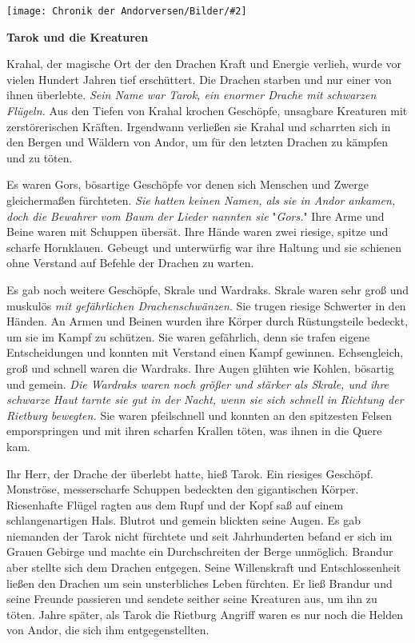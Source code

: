 \documentclass[10pt, a4paper, oneside]{book}
\newcommand{\bildmitts}[2][height=0.32\textwidth,width=0.48\textwidth,keepaspectratio]{%
    \begin{center}
        \texttt{[image: Chronik der Andorversen/Bilder/\#2]}
    \end{center}
}
\begin{document}
\begin{multicols}{2}
\bildmitts{Die Kreaturen Bild 1.jpg}

\textbf{Tarok und die Kreaturen}

Krahal, der magische Ort der den Drachen Kraft und Energie verlieh, wurde vor vielen Hundert Jahren tief erschüttert. Die Drachen starben und nur einer von ihnen überlebte. \textit{Sein Name war Tarok, ein enormer Drache mit schwarzen Flügeln.} Aus den Tiefen von Krahal krochen Geschöpfe, unsagbare Kreaturen mit zerstörerischen Kräften. Irgendwann verließen sie Krahal und scharrten sich in den Bergen und Wäldern von Andor, um für den letzten Drachen zu kämpfen und zu töten.\bigskip

Es waren Gors, bösartige Geschöpfe vor denen sich Menschen und Zwerge gleichermaßen fürchteten. \textit{Sie hatten keinen Namen, als sie in Andor ankamen, doch die Bewahrer vom Baum der Lieder nannten sie }"\textit{Gors.}" Ihre Arme und Beine waren mit Schuppen übersät. Ihre Hände waren zwei riesige, spitze und scharfe Hornklauen. Gebeugt und unterwürfig war ihre Haltung und sie schienen ohne Verstand auf Befehle der Drachen zu warten.\bigskip

Es gab noch weitere Geschöpfe, Skrale und Wardraks. Skrale waren sehr groß und muskulös \textit{mit gefährlichen Drachenschwänzen}. Sie trugen riesige Schwerter in den Händen. An Armen und Beinen wurden ihre Körper durch Rüstungsteile bedeckt, um sie im Kampf zu schützen. Sie waren gefährlich, denn sie trafen eigene Entscheidungen und konnten mit Verstand einen Kampf gewinnen. Echsengleich, groß und schnell waren die Wardraks. Ihre Augen glühten wie Kohlen, bösartig und gemein. \textit{Die Wardraks waren noch größer und stärker als Skrale, und ihre schwarze Haut tarnte sie gut in der Nacht, wenn sie sich schnell in Richtung der Rietburg bewegten.} Sie waren pfeilschnell und konnten an den spitzesten Felsen emporspringen und mit ihren scharfen Krallen töten, was ihnen in die Quere kam.\bigskip

Ihr Herr, der Drache der überlebt hatte, hieß Tarok. Ein riesiges Geschöpf. Monströse, messerscharfe Schuppen bedeckten den gigantischen Körper. Riesenhafte Flügel ragten aus dem Rupf und der Kopf saß auf einem schlangenartigen Hals. Blutrot und gemein blickten seine Augen.\newpage %
Es gab niemanden der Tarok nicht fürchtete und seit Jahrhunderten befand er sich im Grauen Gebirge und machte ein Durchschreiten der Berge unmöglich. Brandur aber stellte sich dem Drachen entgegen. Seine Willenskraft und Entschlossenheit ließen den Drachen um sein unsterbliches Leben fürchten. Er ließ Brandur und seine Freunde passieren und sendete seither seine Kreaturen aus, um ihn zu töten. Jahre später, als Tarok die Rietburg Angriff waren es nur noch die Helden von Andor, die sich ihm entgegenstellten.\bigskip


\end{multicols}
\end{document}

